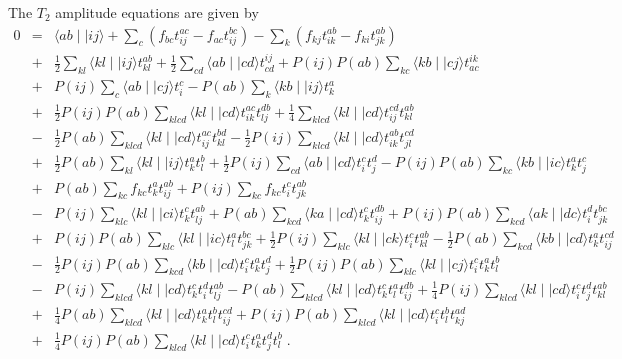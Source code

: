 \documentclass{article}
\begin{document}
The $T_2$ amplitude equations are given by 
\begin{eqnarray}
0 & = & \langle ab \mid\mid ij \rangle 
+ \sum_c\left(f_{bc}t^{ac}_{ij} - f_{ac}t^{bc}_{ij}\right)
- \sum_k\left(f_{kj}t^{ab}_{ik} - f_{ki}t^{ab}_{jk}\right)  \nonumber \\
  & + & \frac{1}{2}\sum_{kl}\langle kl \mid \mid ij\rangle t_{kl}^{ab}
+ \frac{1}{2}\sum_{cd}\langle ab \mid \mid cd\rangle t_{cd}^{ij}
+ P(ij)P(ab)\sum_{kc}\langle kb \mid \mid cj\rangle t_{ac}^{ik} \nonumber \\
  & + & P(ij)\sum_c \langle ab \mid\mid cj\rangle t^c_i
- P(ab)\sum_k \langle kb \mid\mid ij\rangle t^a_k \nonumber \\
  & + & \frac{1}{2}P(ij)P(ab)\sum_{klcd} \langle kl\mid\mid cd \rangle 
        t_{ik}^{ac}t_{lj}^{db} 
+ \frac{1}{4}\sum_{klcd} \langle kl\mid\mid cd \rangle 
        t_{ij}^{cd}t_{kl}^{ab} \nonumber \\
&-& \frac{1}{2}P(ab)\sum_{klcd} \langle kl\mid\mid cd \rangle 
        t_{ij}^{ac}t_{kl}^{bd} 
- \frac{1}{2}P(ij)\sum_{klcd} \langle kl\mid\mid cd \rangle 
        t_{ik}^{ab}t_{jl}^{cd}  \nonumber \\
  & + & \frac{1}{2}P(ab)\sum_{kl}\langle kl \mid\mid ij\rangle t^a_kt^b_l
+ \frac{1}{2}P(ij)\sum_{cd}\langle ab\mid\mid cd\rangle t^c_i t^d_j
- P(ij)P(ab)\sum_{kc}\langle kb\mid\mid ic\rangle t^a_k t^c_j \nonumber \\
  & + & P(ab) \sum_{kc} f_{kc} t^a_k t^{ab}_{ij} 
+  P(ij) \sum_{kc} f_{kc} t^c_i t^{ab}_{jk}  \nonumber \\
  & - & P(ij)\sum_{klc} \langle kl\mid\mid ci\rangle t^c_k t^{ab}_{lj}
+  P(ab)\sum_{kcd} \langle ka\mid\mid cd\rangle t^c_k t^{db}_{ij}
+  P(ij)P(ab)\sum_{kcd} \langle ak\mid\mid dc\rangle t^d_i t^{bc}_{jk}
   \nonumber \\
  & + & P(ij)P(ab)\sum_{klc} \langle kl\mid\mid ic\rangle t^a_l t^{bc}_{jk}
+ \frac{1}{2} P(ij)\sum_{klc} \langle kl\mid\mid ck\rangle t^c_i t^{ab}_{kl}
- \frac{1}{2} P(ab)\sum_{kcd} \langle kb\mid\mid cd\rangle t^a_k t^{cd}_{ij}
  \nonumber \\
  & - & \frac{1}{2} P(ij)P(ab)\sum_{kcd}\langle kb\mid\mid cd \rangle 
         t^c_it^a_kt^d_j
+ \frac{1}{2} P(ij)P(ab)\sum_{klc}\langle kl\mid\mid cj \rangle 
         t^c_it^a_kt^b_l \nonumber \\
  & - & P(ij)\sum_{klcd} \langle kl \mid\mid cd \rangle t^c_k t^d_i t^{ab}_{lj}
- P(ab)\sum_{klcd} \langle kl \mid\mid cd \rangle t^c_k t^a_l t^{db}_{ij}
+ \frac{1}{4}P(ij)\sum_{klcd} \langle kl \mid\mid cd \rangle 
    t^c_i t^d_j t^{ab}_{kl} \nonumber \\
  & + & \frac{1}{4}P(ab)\sum_{klcd} \langle kl \mid\mid cd \rangle 
    t^a_k t^b_l t^{cd}_{ij} 
+ P(ij)P(ab)\sum_{klcd} \langle kl \mid\mid cd \rangle 
t^c_i t^b_l t^{ad}_{kj}\nonumber \\
&+& \frac{1}{4}P(ij)P(ab)\sum_{klcd} \langle kl \mid\mid cd \rangle 
  t^c_i t^a_k t^d_j t^b_l \;.
\label{t2_eqn}
\end{eqnarray}
\end{document}
